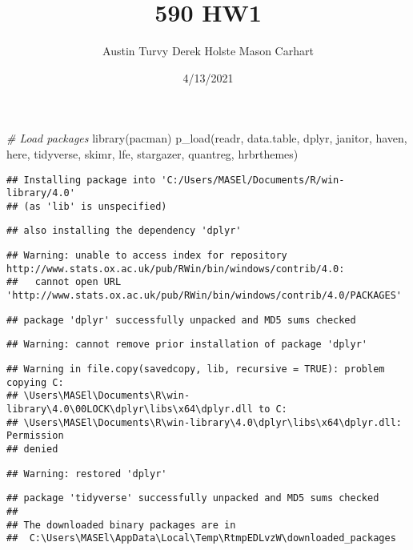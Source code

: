 \documentclass[
]{article}
\title{590 HW1}
\author{Austin Turvy Derek Holste Mason Carhart}
\date{4/13/2021}
\newenvironment{Shaded}{\begin{snugshade}}{\end{snugshade}}
\newcommand{\CommentTok}[1]{\textcolor[rgb]{0.56,0.35,0.01}{\textit{#1}}}
\newcommand{\FunctionTok}[1]{\textcolor[rgb]{0.00,0.00,0.00}{#1}}
\newcommand{\NormalTok}[1]{#1}
\begin{document}
\maketitle

\begin{Shaded}
\begin{Highlighting}[]
\CommentTok{\# Load packages}
\FunctionTok{library}\NormalTok{(pacman)}
\FunctionTok{p\_load}\NormalTok{(readr, data.table, dplyr, janitor, haven, here, }
\NormalTok{       tidyverse, skimr, lfe, stargazer, quantreg, hrbrthemes)}
\end{Highlighting}
\end{Shaded}

\begin{verbatim}
## Installing package into 'C:/Users/MASEl/Documents/R/win-library/4.0'
## (as 'lib' is unspecified)
\end{verbatim}

\begin{verbatim}
## also installing the dependency 'dplyr'
\end{verbatim}

\begin{verbatim}
## Warning: unable to access index for repository http://www.stats.ox.ac.uk/pub/RWin/bin/windows/contrib/4.0:
##   cannot open URL 'http://www.stats.ox.ac.uk/pub/RWin/bin/windows/contrib/4.0/PACKAGES'
\end{verbatim}

\begin{verbatim}
## package 'dplyr' successfully unpacked and MD5 sums checked
\end{verbatim}

\begin{verbatim}
## Warning: cannot remove prior installation of package 'dplyr'
\end{verbatim}

\begin{verbatim}
## Warning in file.copy(savedcopy, lib, recursive = TRUE): problem copying C:
## \Users\MASEl\Documents\R\win-library\4.0\00LOCK\dplyr\libs\x64\dplyr.dll to C:
## \Users\MASEl\Documents\R\win-library\4.0\dplyr\libs\x64\dplyr.dll: Permission
## denied
\end{verbatim}

\begin{verbatim}
## Warning: restored 'dplyr'
\end{verbatim}

\begin{verbatim}
## package 'tidyverse' successfully unpacked and MD5 sums checked
## 
## The downloaded binary packages are in
##  C:\Users\MASEl\AppData\Local\Temp\RtmpEDLvzW\downloaded_packages
\end{verbatim}
\end{document}
